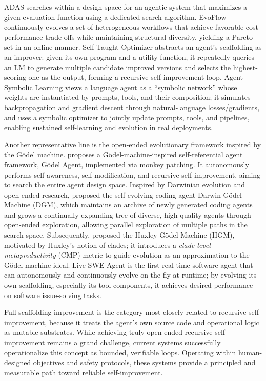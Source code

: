 \documentclass{article}
\begin{document}
ADAS \citep{hu2025automateddesignagenticsystems} searches within a design space for an agentic system that maximizes a given evaluation function using a dedicated search algorithm. EvoFlow continuously evolves a set of heterogeneous workflows that achieve favorable cost–performance trade-offs while maintaining structural diversity, yielding a Pareto set in an online manner. Self-Taught Optimizer \citep{zelikman2024self} abstracts an agent’s scaffolding as an improver: given its own program and a utility function, it repeatedly queries an LM to generate multiple candidate improved versions and selects the highest-scoring one as the output, forming a recursive self-improvement loop. Agent Symbolic Learning \citep{ou2025symbolic} views a language agent as a “symbolic network” whose weights are instantiated by prompts, tools, and their composition; it simulates backpropagation and gradient descent through natural-language losses/gradients, and uses a symbolic optimizer to jointly update prompts, tools, and pipelines, enabling sustained self-learning and evolution in real deployments.

Another representative line is the open-ended evolutionary framework inspired by the Gödel machine. \citet{yin2025godel} proposes a Gödel-machine-inspired self-referential agent framework, Gödel Agent, implemented via monkey patching. It autonomously performs self-awareness, self-modification, and recursive self-improvement, aiming to search the entire agent design space. Inspired by Darwinian evolution and open-ended research, \cite{zhang2025darwingodelmachineopenended} proposed the self-evolving coding agent Darwin Gödel Machine (DGM), which maintains an archive of newly generated coding agents and grows a continually expanding tree of diverse, high-quality agents through open-ended exploration, allowing parallel exploration of multiple paths in the search space. Subsequently, \cite{wang2025huxleygodelmachinehumanlevelcoding} proposed the Huxley-Gödel Machine (HGM), motivated by Huxley’s notion of clades; it introduces a \textit{clade-level metaproductivity} (CMP) metric to guide evolution as an approximation to the Gödel-machine ideal. Live-SWE-Agent \citep{xia2025livesweagentsoftwareengineeringagents} is the first real-time software agent that can autonomously and continuously evolve on the fly at runtime; by evolving its own scaffolding, especially its tool components, it achieves desired performance on software issue-solving tasks.

\begin{ttcolorbox}[Takeaway]
Full scaffolding improvement is the category most closely related to recursive self-improvement, because it treats the agent's own source code and operational logic as mutable substrates. While achieving truly open-ended recursive self-improvement remains a grand challenge, current systems successfully operationalize this concept as bounded, verifiable loops. Operating within human-designed objectives and safety protocols, these systems provide a principled and measurable path toward reliable self-improvement.
\end{ttcolorbox}
\end{document}
